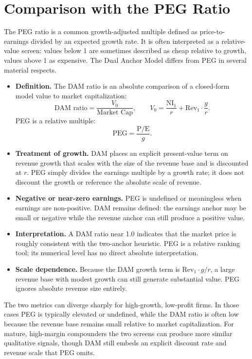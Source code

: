 \documentclass[11pt]{article}
\begin{document}
\section{Comparison with the PEG Ratio}
The PEG ratio is a common growth-adjusted multiple defined as price-to-earnings divided by an expected growth rate. It is often interpreted as a relative-value screen: values below 1 are sometimes described as cheap relative to growth, values above 1 as expensive. The Dual Anchor Model differs from PEG in several material respects.

\begin{itemize}[noitemsep]
\item \textbf{Definition.} The DAM ratio is an absolute comparison of a closed-form model value to market capitalization:
\[
\text{DAM ratio} = \frac{V_0}{\text{Market Cap}}, \qquad V_0 = \frac{\mathrm{NI}_1}{r} + \mathrm{Rev}_1 \cdot \frac{g}{r}.
\]
PEG is a relative multiple:
\[
\text{PEG} = \frac{\text{P/E}}{g}.
\]
\item \textbf{Treatment of growth.} DAM places an explicit present-value term on revenue growth that scales with the size of the revenue base and is discounted at \(r\). PEG simply divides the earnings multiple by a growth rate; it does not discount the growth or reference the absolute scale of revenue.
\item \textbf{Negative or near-zero earnings.} PEG is undefined or meaningless when earnings are non-positive. DAM remains defined: the earnings anchor may be small or negative while the revenue anchor can still produce a positive value.
\item \textbf{Interpretation.} A DAM ratio near 1.0 indicates that the market price is roughly consistent with the two-anchor heuristic. PEG is a relative ranking tool; its numerical level has no direct absolute interpretation.
\item \textbf{Scale dependence.} Because the DAM growth term is \(\mathrm{Rev}_1 \cdot g / r\), a large revenue base with modest growth can still generate substantial value. PEG ignores absolute revenue size entirely.
\end{itemize}

The two metrics can diverge sharply for high-growth, low-profit firms. In those cases PEG is typically elevated or undefined, while the DAM ratio is often low because the revenue base remains small relative to market capitalization. For mature, high-margin compounders the two screens can produce more similar qualitative signals, though DAM still embeds an explicit discount rate and revenue scale that PEG omits.
\end{document}
